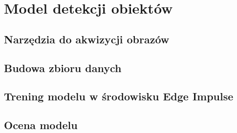 \chapter{Model detekcji obiektów}
\label{chap:model}

\section{Narzędzia do akwizycji obrazów}
\label{sec:akwizycja-narzedzia}

\section{Budowa zbioru danych}
\label{sec:dataset}

\section{Trening modelu w środowisku Edge Impulse}
\label{sec:trening}

\section{Ocena modelu}
\label{sec:ocena-modelu}
